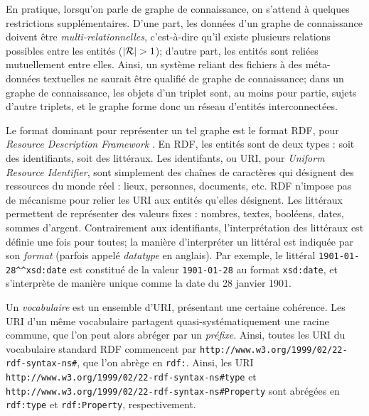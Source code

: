 En pratique, lorsqu'on parle de graphe de connaissance, on s'attend à quelques restrictions supplémentaires. D'une part, les données d'un graphe de connaissance doivent être \textit{multi-relationnelles}, c'est-à-dire qu'il existe plusieurs relations possibles entre les entités ($| \mathcal{R} | > 1$); d'autre part, les entités sont reliées mutuellement entre elles. Ainsi, un système reliant des fichiers à des méta-données textuelles ne saurait être qualifié de graphe de connaissance; dans un graphe de connaissance, les objets d'un triplet sont, au moins pour partie, sujets d'autre triplets, et le graphe forme donc un réseau d'entités interconnectées. 


Le format dominant pour représenter un tel graphe est le format RDF, pour \textit{Resource Description Framework} \cite{cyganiak14}. En RDF, les entités sont de deux types : soit des identifiants, soit des littéraux. Les identifants, ou URI, pour \textit{Uniform Resource Identifier}, sont simplement des chaînes de caractères qui désignent des ressources du monde réel : lieux, personnes, documents, etc. %
RDF n'impose pas de mécanisme pour relier les URI aux entités qu'elles désignent. 
Les littéraux permettent de représenter des valeurs fixes : nombres, textes, booléens, dates, sommes d'argent. Contrairement aux identifiants, l'interprétation des littéraux est définie une fois pour toutes; la manière d'interpréter un littéral est indiquée par son \textit{format} (parfois appelé \textit{datatype} en anglais). Par exemple, le littéral \texttt{1901-01-28\^{}\^{}xsd:date} est constitué de la valeur \texttt{1901-01-28} au format \texttt{xsd:date}, et s'interprète de manière unique comme la date du 28 janvier 1901.

Un \textit{vocabulaire} est un ensemble d'URI, présentant une certaine cohérence. Les URI d'un même vocabulaire partagent quasi-systématiquement une racine commune, que l'on peut alors abréger par un \textit{préfixe}. Ainsi, toutes les URI du vocabulaire standard RDF commencent par \texttt{http://www.w3.org/1999/02/22-rdf-syntax-ns\#}, que l'on abrège en \texttt{rdf:}. Ainsi, les URI \texttt{http://www.w3.org/1999/02/22-rdf-syntax-ns\#type} et \texttt{http://www.w3.org/1999/02/22-rdf-syntax-ns\#Property} sont abrégées en \texttt{rdf:type} et \texttt{rdf:Property}, respectivement. 



